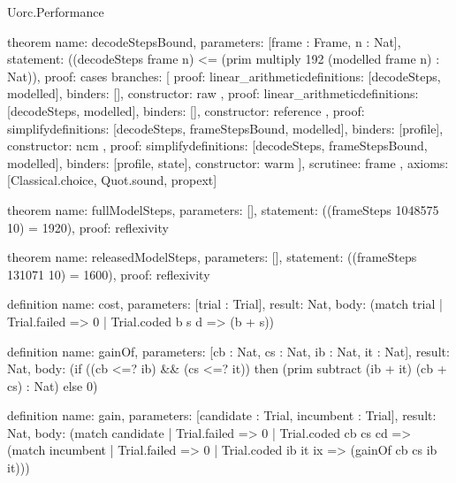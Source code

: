\begin{lexlean}{Uorc.Performance}
\begin{semanticmodule}
theorem{
  name: decodeStepsBound,
  parameters: [frame : Frame, n : Nat],
  statement: ((decodeSteps frame n) <= (prim multiply 192 (modelled frame n) : Nat)),
  proof: cases{
    branches: [
      {
        proof: linear_arithmetic{definitions: [decodeSteps, modelled]},
        binders: [],
        constructor: raw
      },
      {
        proof: linear_arithmetic{definitions: [decodeSteps, modelled]},
        binders: [],
        constructor: reference
      },
      {
        proof: simplify{definitions: [decodeSteps, frameStepsBound, modelled]},
        binders: [profile],
        constructor: ncm
      },
      {
        proof: simplify{definitions: [decodeSteps, frameStepsBound, modelled]},
        binders: [profile, state],
        constructor: warm
      }
    ],
    scrutinee: frame
  },
  axioms: [Classical.choice, Quot.sound, propext]
}

theorem{
  name: fullModelSteps,
  parameters: [],
  statement: ((frameSteps 1048575 10) = 1920),
  proof: reflexivity{}
}

theorem{
  name: releasedModelSteps,
  parameters: [],
  statement: ((frameSteps 131071 10) = 1600),
  proof: reflexivity{}
}

definition{
  name: cost,
  parameters: [trial : Trial],
  result: Nat,
  body: (match trial | Trial.failed => 0 | Trial.coded b s d => (b + s))
}

definition{
  name: gainOf,
  parameters: [cb : Nat, cs : Nat, ib : Nat, it : Nat],
  result: Nat,
  body: (if ((cb <=? ib) && (cs <=? it)) then (prim subtract (ib + it) (cb + cs) : Nat) else 0)
}

definition{
  name: gain,
  parameters: [candidate : Trial, incumbent : Trial],
  result: Nat,
  body: (match candidate
    | Trial.failed => 0
    | Trial.coded cb cs cd => (match incumbent
      | Trial.failed => 0
      | Trial.coded ib it ix => (gainOf cb cs ib it)))
}


\end{semanticmodule}
\end{lexlean}
